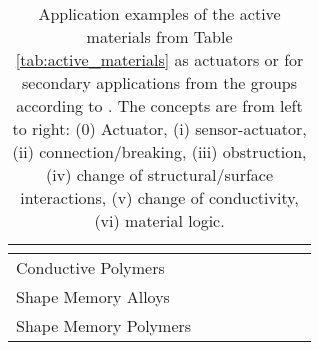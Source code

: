 \documentclass{article}
\begin{document}
\begin{landscape}
\begin{table}[htbp]
\begin{tabular}{|p{3.5cm}|p{1.7cm}|p{1.7cm}|p{1.7cm}|p{1.7cm}|p{1.7cm}|p{1.7cm}|p{1.7cm}|}
			& 
			&  \cite{Yun2011}
			&  \cite{Low2024,Yun2009}
			&  \cite{Lee2008}
			&  \cite{Wang2022a}
			\\
			\hline
			Conductive Polymers		
			& \cite{Baughman1996,Madden2002,Smela1993,Otero1998,Das2012,Wu2005}
			& 
			& 
			&  
			&  
			&  
			&  
			\\
			\hline
			Shape Memory Alloys		
			& \cite{Sofla2008,Benard1998,Kumar2020}
			& \cite{Furst2013} 
			& 
			&  \cite{Megnin2013}
			&  \cite{Manzo2005,Hartl2007,Calkins2010} %
			&  \cite{Hasan2016,Sutapun1998,TabibAzar1999}
			&  
			\\
			\hline
			Shape Memory Polymers 		
			& \cite{Behl2013,Xing2020,Song2015}
			& 
			& 
			&  
			&  \cite{Lin2006,Gandhi2007,McKnight2005}  %
			&  \cite{Wang2022,Wischke2010}
			&  
			\\
			\hline
		\end{tabular}
		\caption{Application examples of the active materials from Table \ref{tab:active_materials} as actuators or for secondary applications from the groups according to \cite{Ehrenhofer2025shapes_review}. The concepts are from left to right: (0) Actuator, (i) sensor-actuator, (ii) connection/breaking, (iii) obstruction, (iv) change of structural/surface interactions, (v) change of conductivity, (vi) material logic.}
		\label{tab:active_applications}
	\end{table}
\end{landscape}



	
	
\end{document}
